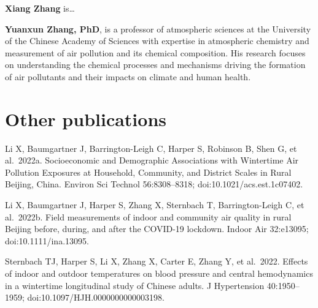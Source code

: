 \documentclass[
  letterpaper,
  DIV=11,
  numbers=noendperiod]{scrartcl}
\begin{document}
\textbf{Xiang Zhang} is\ldots{}

\textbf{Yuanxun Zhang, PhD}, is a professor of atmospheric sciences at
the University of the Chinese Academy of Sciences with expertise in
atmospheric chemistry and measurement of air pollution and its chemical
composition. His research focuses on understanding the chemical
processes and mechanisms driving the formation of air pollutants and
their impacts on climate and human health.

\section*{Other publications}\label{other-publications}

Li X, Baumgartner J, Barrington-Leigh C, Harper S, Robinson B, Shen G,
et al.~2022a. Socioeconomic and Demographic Associations with Wintertime
Air Pollution Exposures at Household, Community, and District Scales in
Rural Beijing, China. Environ Sci Technol 56:8308--8318;
doi:10.1021/acs.est.1c07402.

Li X, Baumgartner J, Harper S, Zhang X, Sternbach T, Barrington-Leigh C,
et al.~2022b. Field measurements of indoor and community air quality in
rural Beijing before, during, and after the COVID-19 lockdown. Indoor
Air 32:e13095; doi:10.1111/ina.13095.

Sternbach TJ, Harper S, Li X, Zhang X, Carter E, Zhang Y, et al.~2022.
Effects of indoor and outdoor temperatures on blood pressure and central
hemodynamics in a wintertime longitudinal study of Chinese adults. J
Hypertension 40:1950--1959; doi:10.1097/HJH.0000000000003198.
\end{document}
